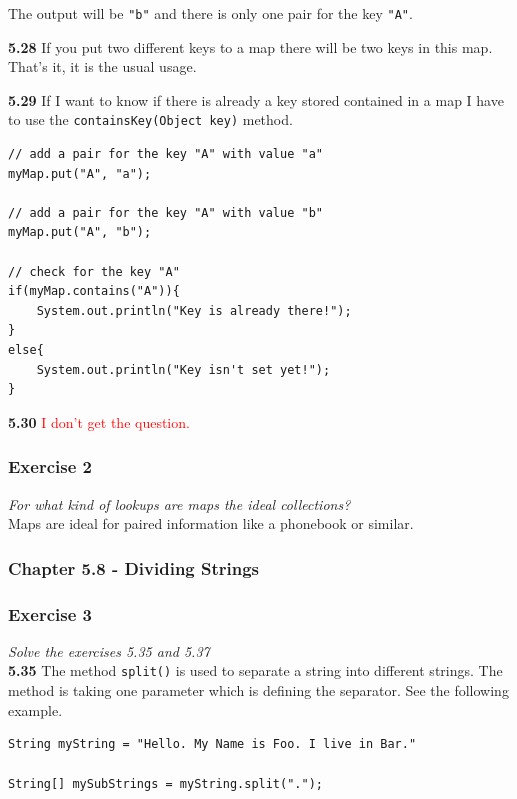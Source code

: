 The output will be \lstinline{"b"} and there is only one pair for 
the key \lstinline{"A"}.

\textbf{5.28} If you put two different keys to a map there will be 
two keys in this map. That's it, it is the usual usage.

\textbf{5.29} If I want to know if there is already a key stored contained
in a map I have to use the \lstinline{containsKey(Object key)} method.

\begin{lstlisting}
// add a pair for the key "A" with value "a"
myMap.put("A", "a");

// add a pair for the key "A" with value "b"
myMap.put("A", "b");

// check for the key "A"
if(myMap.contains("A")){
	System.out.println("Key is already there!");
}
else{
	System.out.println("Key isn't set yet!");
}
\end{lstlisting}

\textbf{5.30} \textcolor{red}{I don't get the question.}

\subsubsection*{Exercise 2}
\textit{For what kind of lookups are maps the ideal collections?} \\
Maps are ideal for paired information like a phonebook or similar.

\subsubsection{Chapter 5.8 - Dividing Strings}

\subsubsection*{Exercise 3}
\textit{Solve the exercises 5.35 and 5.37} \\

\textbf{5.35} The method \lstinline{split()} is used to separate a string
into different strings. The method is taking one parameter which is defining
the separator. See the following example.

\begin{lstlisting}
String myString = "Hello. My Name is Foo. I live in Bar."

String[] mySubStrings = myString.split(".");
\end{lstlisting}

